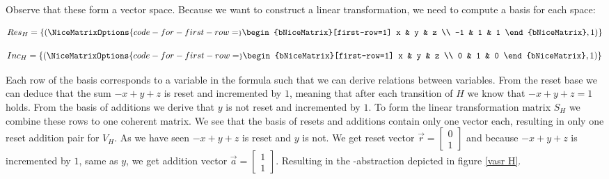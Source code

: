 Observe that these form a vector space. Because we want to construct a linear transformation, we need to compute a basis for each space:
\vspace*{-1em}
\begin{center}
	\begin{minipage}{0.5\linewidth}
		\begin{equation*}
			Res_H = \{(
			\NiceMatrixOptions{code-for-first-row=\scriptstyle}
			\begin{bNiceMatrix}[first-row=1]
				x & y & z \\
				-1 & 1 & 1 
			\end{bNiceMatrix}, 1)\}
		\end{equation*}
	\end{minipage}
	\begin{minipage}{0.4\linewidth}
		\begin{equation*}
			Inc_H = \{(
			\NiceMatrixOptions{code-for-first-row=\scriptstyle}
			\begin{bNiceMatrix}[first-row=1] 
				x & y & z \\
				0 & 1 & 0 
			\end{bNiceMatrix}, 1)\}
		\end{equation*}
	\end{minipage}
\end{center}
Each row of the basis corresponds to a variable in the formula such that we can derive relations between variables. From the reset base we can deduce that the sum $-x + y + z$ is reset and incremented by $1$, meaning that after each transition of $H$ we know that $-x + y + z = 1$ holds. From the basis of additions we derive that $y$ is not reset and incremented by $1$. To form the linear transformation matrix $S_H$ we combine these rows to one coherent matrix. We see that the basis of resets and additions contain only one vector each, resulting in only one reset addition pair for $V_H$. As we have seen $-x + y + z$ is reset and $y$ is not. We get reset vector $\vec{r} = \begin{bmatrix} 0 \\ 1 \end{bmatrix}$ and because $-x + y + z$ is incremented by $1$, same as $y$, we get addition vector $\vec{a} = \begin{bmatrix} 1 \\ 1 \end{bmatrix}$. Resulting in the \qvasr-abstraction depicted in figure \ref{vasr  H}.
\vspace*{-2em}
